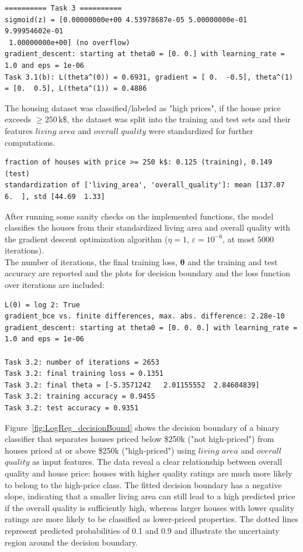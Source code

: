 \documentclass[11pt,a4paper]{article}
\providecommand{\tth}{\boldsymbol{\theta}}
\begin{document}
\begin{lstlisting}
========== Task 3 ==========
sigmoid(z) = [0.00000000e+00 4.53978687e-05 5.00000000e-01 9.99954602e-01
 1.00000000e+00] (no overflow)
gradient_descent: starting at theta0 = [0. 0.] with learning_rate = 1.0 and eps = 1e-06
Task 3.1(b): L(theta^(0)) = 0.6931, gradient = [ 0.  -0.5], theta^(1) = [0.  0.5], L(theta^(1)) = 0.4886
\end{lstlisting}
\vspace{1em}
\noindent The housing dataset was classified/labeled as "high prices", if the house price exceeds $\geq 250\,\text{k\$}$, the dataset was split 
into the training and test sets and their features $living$ $area$ and $overall$ $quality$ were standardized for further computations.
\vspace{0.5em}
\begin{lstlisting}
fraction of houses with price >= 250 k$: 0.125 (training), 0.149 (test)
standardization of ['living_area', 'overall_quality']: mean [137.07   6.  ], std [44.69  1.33]
\end{lstlisting}
\vspace{1em}
\noindent After running some sanity checks on the implemented functions, the model classifies the houses from their standardized living area and 
overall quality with the gradient descent optimization algorithm ($\eta = 1$, $\varepsilon = 10^{-6}$, at most $5000$ iterations). 
\\ The number of iterations, the final training loss, $\tth$ and the training and test accuracy are reported and
the plots for decision boundary and the loss function over iterations are included:
\vspace{0.5em}
\begin{lstlisting}
L(0) = log 2: True
gradient_bce vs. finite differences, max. abs. difference: 2.28e-10
gradient_descent: starting at theta0 = [0. 0. 0.] with learning_rate = 1.0 and eps = 1e-06

Task 3.2: number of iterations = 2653
Task 3.2: final training loss = 0.1351
Task 3.2: final theta = [-5.3571242   2.01155552  2.84604839]
Task 3.2: training accuracy = 0.9455
Task 3.2: test accuracy = 0.9351
\end{lstlisting}
\vspace{1em}
\noindent Figure~\ref{fig:LogReg_decisionBound} shows the decision boundary of a binary classifier that separates houses priced below \$250k ("not high-priced") from houses priced at or above \$250k ("high-priced")
using $living$ $area$ and $overall$ $quality$ as input features. The data reveal a clear relationship between overall quality and house price: 
houses with higher quality ratings are much more likely to belong to the high-price class. The fitted decision boundary has a negative slope, 
indicating that a smaller living area can still lead to a high predicted price if the overall quality is sufficiently high, 
whereas larger houses with lower quality ratings are more likely to be classified as lower-priced properties.
The dotted lines represent predicted probabilities of 0.1 and 0.9 and illustrate the uncertainty region around the decision boundary.
\end{document}

